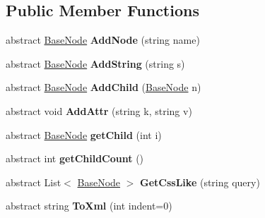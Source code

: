 \subsection*{Public Member Functions}
\begin{DoxyCompactItemize}
\item 
\hypertarget{class_x_m_leru_handleru_1_1_base_node_a6fcb5194ad2113e93bc45c17d728a07a}{}abstract \hyperlink{class_x_m_leru_handleru_1_1_base_node}{Base\+Node} {\bfseries Add\+Node} (string name)\label{class_x_m_leru_handleru_1_1_base_node_a6fcb5194ad2113e93bc45c17d728a07a}

\item 
\hypertarget{class_x_m_leru_handleru_1_1_base_node_a0f28227f706da1e001e48d281513fce4}{}abstract \hyperlink{class_x_m_leru_handleru_1_1_base_node}{Base\+Node} {\bfseries Add\+String} (string s)\label{class_x_m_leru_handleru_1_1_base_node_a0f28227f706da1e001e48d281513fce4}

\item 
\hypertarget{class_x_m_leru_handleru_1_1_base_node_ad5d3ecd24e6f39daaa6010da7b457ef0}{}abstract \hyperlink{class_x_m_leru_handleru_1_1_base_node}{Base\+Node} {\bfseries Add\+Child} (\hyperlink{class_x_m_leru_handleru_1_1_base_node}{Base\+Node} n)\label{class_x_m_leru_handleru_1_1_base_node_ad5d3ecd24e6f39daaa6010da7b457ef0}

\item 
\hypertarget{class_x_m_leru_handleru_1_1_base_node_a6281b4132c69263e42f79f48d83f0ee0}{}abstract void {\bfseries Add\+Attr} (string k, string v)\label{class_x_m_leru_handleru_1_1_base_node_a6281b4132c69263e42f79f48d83f0ee0}

\item 
\hypertarget{class_x_m_leru_handleru_1_1_base_node_a101c0e7962747eb633402df78289f86e}{}abstract \hyperlink{class_x_m_leru_handleru_1_1_base_node}{Base\+Node} {\bfseries get\+Child} (int i)\label{class_x_m_leru_handleru_1_1_base_node_a101c0e7962747eb633402df78289f86e}

\item 
\hypertarget{class_x_m_leru_handleru_1_1_base_node_a10651e524e3ddb41d28b18dab79eda62}{}abstract int {\bfseries get\+Child\+Count} ()\label{class_x_m_leru_handleru_1_1_base_node_a10651e524e3ddb41d28b18dab79eda62}

\item 
\hypertarget{class_x_m_leru_handleru_1_1_base_node_a479e738c0d51104fee57a025649aa69f}{}abstract List$<$ \hyperlink{class_x_m_leru_handleru_1_1_base_node}{Base\+Node} $>$ {\bfseries Get\+Css\+Like} (string query)\label{class_x_m_leru_handleru_1_1_base_node_a479e738c0d51104fee57a025649aa69f}

\item 
\hypertarget{class_x_m_leru_handleru_1_1_base_node_af4ccbd830749f6567dcd46c3cee42b74}{}abstract string {\bfseries To\+Xml} (int indent=0)\label{class_x_m_leru_handleru_1_1_base_node_af4ccbd830749f6567dcd46c3cee42b74}

\end{DoxyCompactItemize}
